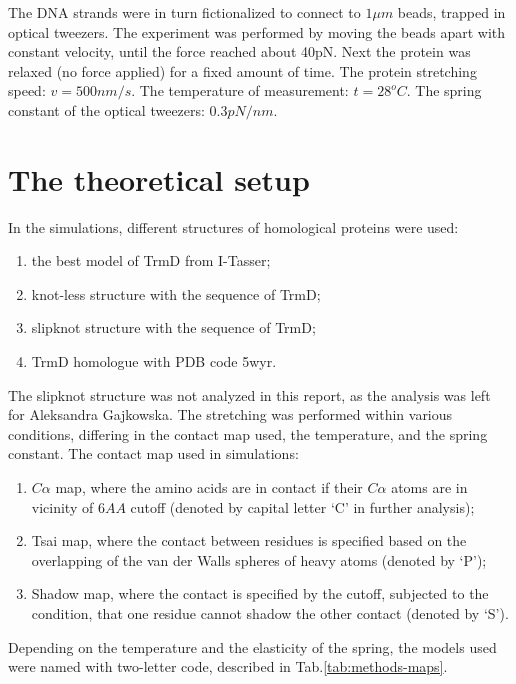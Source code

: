 The DNA strands were in turn fictionalized to connect to $1\mu m$ beads, trapped in optical tweezers.
The experiment was performed by moving the beads apart with constant velocity, until the force reached about 40pN.
Next the protein was relaxed (no force applied) for a fixed amount of time.
The protein stretching speed: $v=500nm/s$.
The temperature of measurement: $t=28^{o}C$.
The spring constant of the optical tweezers: $0.3 pN/nm$.

\section{The theoretical setup}
\label{sec:methods_maps}
In the simulations, different structures of homological proteins were used:
\begin{enumerate}
    \item the best model of TrmD from I-Tasser;
    \item knot-less structure with the sequence of TrmD;
    \item slipknot structure with the sequence of TrmD;
    \item TrmD homologue with PDB code 5wyr.
\end{enumerate}

The slipknot structure was not analyzed in this report, as the analysis was left for Aleksandra Gajkowska.
The stretching was performed within various conditions, differing in the contact map used, the temperature, and the spring constant.
The contact map used in simulations:
\begin{enumerate}
    \item $C\alpha$ map, where the amino acids are in contact if their $C\alpha$ atoms are in vicinity of $6AA$ cutoff (denoted by capital letter `C' in further analysis);
    \item Tsai map, where the contact between residues is specified based on the overlapping of the van der Walls spheres of heavy atoms (denoted by `P');
    \item Shadow map, where the contact is specified by the cutoff, subjected to the condition, that one residue cannot shadow the other contact (denoted by `S').
\end{enumerate}

Depending on the temperature and the elasticity of the spring, the models used were named with two-letter code, described in Tab.\ref{tab:methods-maps}.

